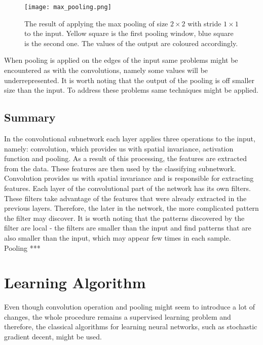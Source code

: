 \documentclass[a4paper,10pt]{report}
\begin{document}
	  \begin{figure}[h!]
	    \centering
	    \texttt{[image: max\_pooling.png]}
	    \caption{The result of applying the max pooling of size $2\times2$ with stride $1\times1$ to the input. Yellow square is the first pooling window, blue square is the second one. The values of the output are coloured accordingly.}
	    \label{fig:max_pooling}
	  \end{figure} 
  
	  When pooling is applied on the edges of the input same problems might be encountered as with the convolutions, namely some values will be underrepresented. It is worth noting that the output of the pooling is off smaller size than the input. To address these problems same techniques might be applied.\\
	  
	  
	\subsection{Summary}
	  In the convolutional subnetwork each layer applies three operations to the input, namely: convolution, which provides us with spatial invariance, activation function and pooling. As a result of this processing, the features are extracted from the data. These features are then used by the classifying subnetwork.\\
	  
	  Convolution provides us with spatial invariance and is responsible for extracting features. Each layer of the convolutional part of the network has its own filters. These filters take advantage of the features that were already extracted in the previous layers. Therefore, the later in the network, the more complicated pattern the filter may discover. It is worth noting that the patterns discovered by the filter are local - the filters are smaller than the input and find patterns that are also smaller than the input, which may appear few times in each sample.\\
	  
	  Pooling ***
	  
	  	  
      
      \section{Learning Algorithm}
      Even though convolution operation and pooling might seem to introduce a lot of changes, the whole procedure remains a supervised learning problem and therefore, the classical algorithms for learning neural networks, such as stochastic gradient decent, might be used.
      
\end{document}
